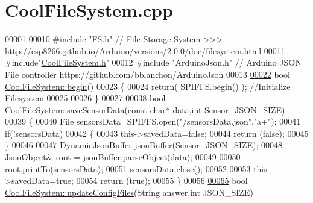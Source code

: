 \hypertarget{_cool_file_system_8cpp_source}{}\section{Cool\+File\+System.\+cpp}

\begin{DoxyCode}
00001 
00010 \textcolor{preprocessor}{#include "FS.h"}                \textcolor{comment}{// File Storage System >>>
       http://esp8266.github.io/Arduino/versions/2.0.0/doc/filesystem.html}
00011 \textcolor{preprocessor}{#include"\hyperlink{_cool_file_system_8h}{CoolFileSystem.h}"}
00012 \textcolor{preprocessor}{#include "ArduinoJson.h"}      \textcolor{comment}{// Arduino JSON File controller  https://github.com/bblanchon/ArduinoJson}
00013 
\hyperlink{class_cool_file_system_a6ba6f666ed4c530174f8569d2c636748}{00022} \textcolor{keywordtype}{bool} \hyperlink{class_cool_file_system_a6ba6f666ed4c530174f8569d2c636748}{CoolFileSystem::begin}()
00023 \{
00024     \textcolor{keywordflow}{return}( SPIFFS.begin() );                                   \textcolor{comment}{//Initialize Filesystem}
00025 
00026 \}
00027 
\hyperlink{class_cool_file_system_a4c560c2ddd40b74b7758e6ceb2c58957}{00038} \textcolor{keywordtype}{bool} \hyperlink{class_cool_file_system_a4c560c2ddd40b74b7758e6ceb2c58957}{CoolFileSystem::saveSensorData}(\textcolor{keyword}{const} \textcolor{keywordtype}{char}* data,\textcolor{keywordtype}{int} Sensor\_JSON\_SIZE)
00039 \{
00040     File sensorsData=SPIFFS.open(\textcolor{stringliteral}{"/sensorsData.json"},\textcolor{stringliteral}{"a+"});
00041     \textcolor{keywordflow}{if}(!sensorsData)
00042     \{
00043         this->savedData=\textcolor{keyword}{false};
00044         \textcolor{keywordflow}{return} (\textcolor{keyword}{false}); 
00045     \}   
00046 
00047     DynamicJsonBuffer jsonBuffer(Sensor\_JSON\_SIZE);
00048     JsonObject& root = jsonBuffer.parseObject(data);
00049     
00050     root.printTo(sensorsData);
00051     sensorsData.close();
00052     
00053     this->savedData=\textcolor{keyword}{true};
00054     \textcolor{keywordflow}{return} (\textcolor{keyword}{true});      
00055 \}
00056 
\hyperlink{class_cool_file_system_a32dad79ae80182a83e2e8f52286b7c7b}{00065} \textcolor{keywordtype}{bool} \hyperlink{class_cool_file_system_a32dad79ae80182a83e2e8f52286b7c7b}{CoolFileSystem::updateConfigFiles}(String answer,\textcolor{keywordtype}{int} JSON\_SIZE)

\end{DoxyCode}
